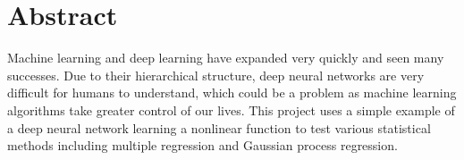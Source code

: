 
\chapter*{Abstract}

Machine learning and deep learning have expanded very quickly and seen many successes.
Due to their hierarchical structure, deep neural networks are very difficult for humans to understand, which could be a problem as machine learning algorithms take greater control of our lives.
This project uses a simple example of a deep neural network learning a nonlinear function to test various statistical methods including multiple regression and Gaussian process regression.
